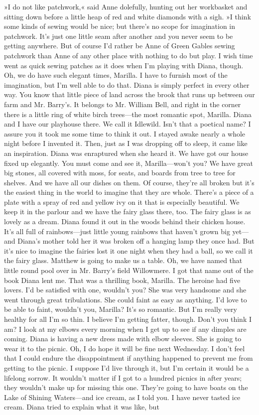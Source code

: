 »I do not like patchwork,« said Anne dolefully, hunting out her workbasket and sitting down before a little heap of red and white diamonds with a sigh. »I think some kinds of sewing would be nice; but there’s no scope for imagination in patchwork. It’s just one little seam after another and you never seem to be getting anywhere. But of course I’d rather be Anne of Green Gables sewing patchwork than Anne of any other place with nothing to do but play. I wish time went as quick sewing patches as it does when I’m playing with Diana, though. Oh, we do have such elegant times, Marilla. I have to furnish most of the imagination, but I’m well able to do that. Diana is simply perfect in every other way. You know that little piece of land across the brook that runs up between our farm and Mr. Barry’s. It belongs to Mr. William Bell, and right in the corner there is a little ring of white birch trees—the most romantic spot, Marilla. Diana and I have our playhouse there. We call it Idlewild. Isn’t that a poetical name? I assure you it took me some time to think it out. I stayed awake nearly a whole night before I invented it. Then, just as I was dropping off to sleep, it came like an inspiration. Diana was enraptured when she heard it. We have got our house fixed up elegantly. You must come and see it, Marilla—won’t you? We have great big stones, all covered with moss, for seats, and boards from tree to tree for shelves. And we have all our dishes on them. Of course, they’re all broken but it’s the easiest thing in the world to imagine that they are whole. There’s a piece of a plate with a spray of red and yellow ivy on it that is especially beautiful. We keep it in the parlour and we have the fairy glass there, too. The fairy glass is as lovely as a dream. Diana found it out in the woods behind their chicken house. It’s all full of rainbows—just little young rainbows that haven’t grown big yet—and Diana’s mother told her it was broken off a hanging lamp they once had. But it’s nice to imagine the fairies lost it one night when they had a ball, so we call it the fairy glass. Matthew is going to make us a table. Oh, we have named that little round pool over in Mr. Barry’s field Willowmere. I got that name out of the book Diana lent me. That was a thrilling book, Marilla. The heroine had five lovers. I’d be satisfied with one, wouldn’t you? She was very handsome and she went through great tribulations. She could faint as easy as anything. I’d love to be able to faint, wouldn’t you, Marilla? It’s so romantic. But I’m really very healthy for all I’m so thin. I believe I’m getting fatter, though. Don’t you think I am? I look at my elbows every morning when I get up to see if any dimples are coming. Diana is having a new dress made with elbow sleeves. She is going to wear it to the picnic. Oh, I do hope it will be fine next Wednesday. I don’t feel that I could endure the disappointment if anything happened to prevent me from getting to the picnic. I suppose I’d live through it, but I’m certain it would be a lifelong sorrow. It wouldn’t matter if I got to a hundred picnics in after years; they wouldn’t make up for missing this one. They’re going to have boats on the Lake of Shining Waters—and ice cream, as I told you. I have never tasted ice cream. Diana tried to explain what it was like, but 